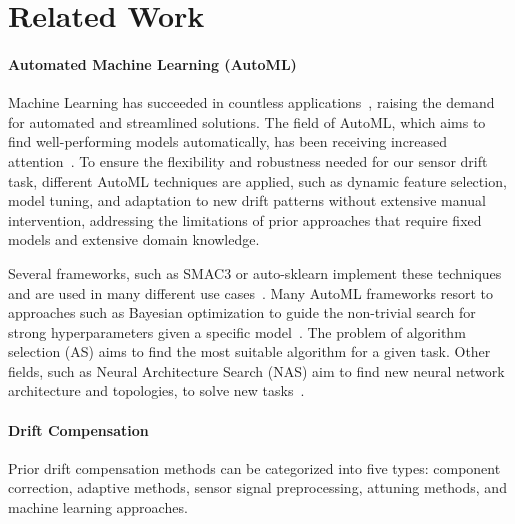 \section{Related Work}
\label{sec:related}
\paragraph{Automated Machine Learning (AutoML)}
Machine Learning has succeeded in countless applications~\cite{TangWangWuChenPangSunFengWang+2023, TangWangWuLiuZhangZhuChenSunWang+2022+849+872,Schaller2023LiquorHGNNAH, schaller2024modeconvnovelconvolutiondistinguishing}, raising the demand for automated and streamlined solutions. The field of AutoML, which aims to find well-performing models automatically, has been receiving increased attention~\cite{AutoML:SMAC}. To ensure the flexibility and robustness needed for our sensor drift task, different AutoML techniques are applied, such as dynamic feature selection, model tuning, and adaptation to new drift patterns without extensive manual intervention, addressing the limitations of prior approaches that require fixed models and extensive domain knowledge.

Several frameworks, such as SMAC3 or auto-sklearn implement these techniques and are used in many different use cases~\cite{AutoML:auto-sklearn, AutoML:SMAC, AutoML:CASH}. Many AutoML frameworks resort to approaches such as Bayesian optimization to guide the non-trivial search for strong hyperparameters given a specific model~\cite{AutoML:SMAC, AutoML:auto-sklearn}. The problem of algorithm selection (AS) aims to find the most suitable algorithm for a given task. Other fields, such as Neural Architecture Search (NAS) aim to find new neural network architecture and topologies, to solve new tasks~\cite{AutoML:NAS}. 


\paragraph{Drift Compensation}\label{sec:drift_compensation}
Prior drift compensation methods can be categorized into five types: component correction, adaptive methods, sensor signal preprocessing, attuning methods, and machine learning approaches.

